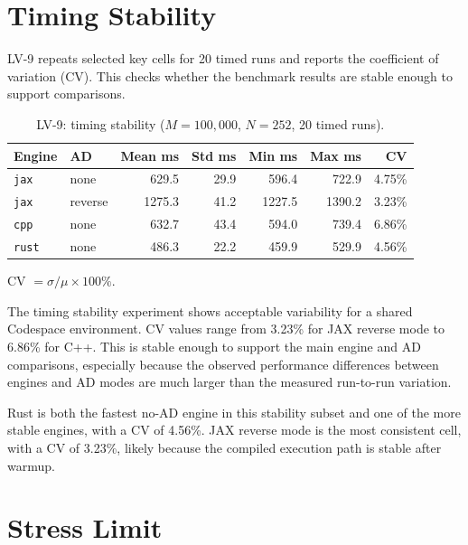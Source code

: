 \section{Timing Stability}
\label{sec:results-timing-stability}

LV-9 repeats selected key cells for 20 timed runs and reports the coefficient
of variation (CV).  This checks whether the benchmark results are stable
enough to support comparisons.

\begin{table}[htbp]
\centering
\small
\begin{threeparttable}
\caption{LV-9: timing stability (\(M=100{,}000\), \(N=252\), 20 timed runs).}
\label{tab:lv9-timing-stability}
\begin{tabular}{llrrrrr}
\toprule
\textbf{Engine}
& \textbf{AD}
& \textbf{Mean ms}
& \textbf{Std ms}
& \textbf{Min ms}
& \textbf{Max ms}
& \textbf{CV} \\
\midrule
\texttt{jax}  & none    & 629.5  & 29.9 & 596.4  & 722.9  & 4.75\% \\
\texttt{jax}  & reverse & 1275.3 & 41.2 & 1227.5 & 1390.2 & 3.23\% \\
\texttt{cpp}  & none    & 632.7  & 43.4 & 594.0  & 739.4  & 6.86\% \\
\texttt{rust} & none    & 486.3  & 22.2 & 459.9  & 529.9  & 4.56\% \\
\bottomrule
\end{tabular}
\begin{tablenotes}
\footnotesize
\item CV \(= \sigma/\mu \times 100\%\).
\end{tablenotes}
\end{threeparttable}
\end{table}

The timing stability experiment shows acceptable variability for a shared
Codespace environment.  CV values range from 3.23\% for JAX reverse mode to
6.86\% for C++.  This is stable enough to support the main engine and AD
comparisons, especially because the observed performance differences between
engines and AD modes are much larger than the measured run-to-run variation.

Rust is both the fastest no-AD engine in this stability subset and one of the
more stable engines, with a CV of 4.56\%.  JAX reverse mode is the most
consistent cell, with a CV of 3.23\%, likely because the compiled execution
path is stable after warmup.

\section{Stress Limit}
\label{sec:results-stress-limit}


